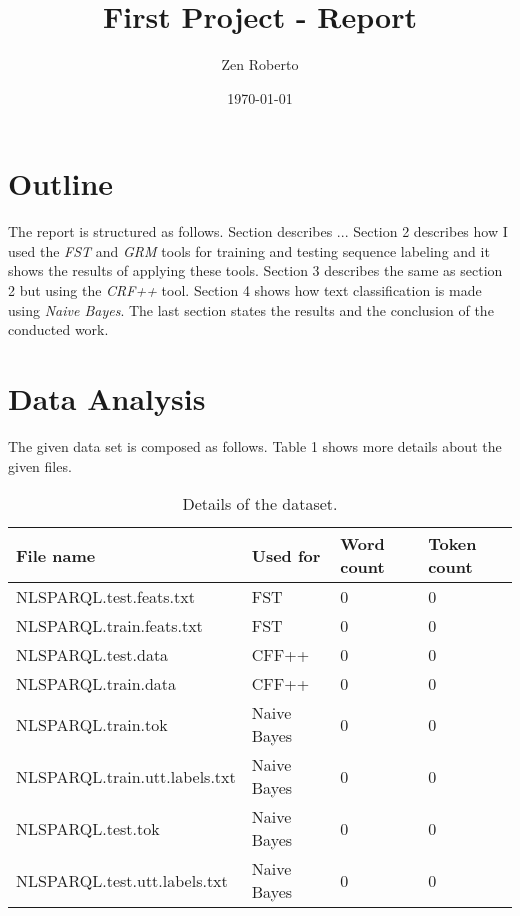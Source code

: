 \documentclass[a4paper,8pt,oneside]{article}
\author{Zen Roberto}
\title{\vspace{-4em} \LARGE First Project - Report}
\date{\today}
\begin{document}




\tableofcontents
\newpage

\section{Outline}

The report is structured as follows. Section describes ...
Section 2 describes how I used the \textit{FST} and \textit{GRM} tools for training and testing sequence labeling and it shows the results of applying these tools. Section 3 describes the same as section 2 but using the \textit{CRF++} tool.
Section 4 shows how text classification is made using \textit{Naive Bayes}.
The last section states the results and the conclusion of the conducted work.

\section{Data Analysis}

The given data set is composed as follows. Table 1 shows more details about the given files.

\begin{table}[h!]
	\vspace{0.2cm}
	\renewcommand*\arraystretch{1.5}
	\begin{center}
	\begin{tabular}{|l|l|l|l|}
		\hline
		File name & Used for & Word count & Token count \\ \hline

		NLSPARQL.test.feats.txt	& FST & 0 & 0 \\ \hline
		NLSPARQL.train.feats.txt & FST & 0 & 0 \\ \hline
		
		NLSPARQL.test.data	& CFF++ & 0 & 0 \\ \hline
		NLSPARQL.train.data	& CFF++ & 0 & 0 \\ \hline
		
		NLSPARQL.train.tok	& Naive Bayes & 0 & 0 \\ \hline
		NLSPARQL.train.utt.labels.txt & Naive Bayes & 0 & 0 \\ \hline
		NLSPARQL.test.tok	& Naive Bayes & 0 & 0 \\ \hline
		NLSPARQL.test.utt.labels.txt & Naive Bayes & 0 & 0 \\ \hline
		
	\end{tabular}
	\vspace{0.2cm}
	\caption{Details of the dataset.}
	\label{table:dataset_details}
	\end{center}
\end{table}
\end{document}
